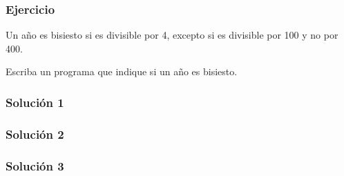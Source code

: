 \documentclass[12pt]{beamer}
\begin{document}
  \begin{frame}
    \frametitle{Ejercicio}
    \label{ejercicio-bisiesto}

    Un año es bisiesto si es divisible por 4,
    excepto si es divisible por 100 y no por 400.
    
    Escriba un programa que indique
    si un año es bisiesto.
    \vfill
    
    
    
    
  \end{frame}

  \begin{frame}
    \label{bisiesto-1}
    \frametitle{Solución 1}
    
  \end{frame}

  \begin{frame}
    \label{bisiesto-2}
    \frametitle{Solución 2}
    
  \end{frame}

  \begin{frame}
    \label{bisiesto-3}
    \frametitle{Solución 3}
    
  \end{frame}
\end{document}
